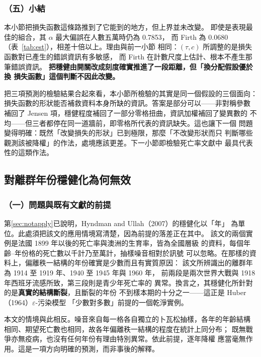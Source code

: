 \documentclass[UTF8, fontset=macnew, a4paper, 12pt]{ctexart}
\begin{document}
\subsubsection{（五）小結}

本小節把損失函數這條路推到了它能到的地方，但上界並未改變。
即使是表現最佳的組合，其 $\alpha$ 最大偏誤在人數五萬時仍為 0.7853，
而 Firth 為 0.0680（表~\ref{tab:est}），相差十倍以上。理由與前一小節
相同：$(\tau,c)$ 所調整的是損失函數對已產生的錯誤資訊有多敏感，
而 Firth 在計數尺度上估計、根本不產生那筆錯誤資訊。
\textbf{把穩健由開關改成刻度確實推進了一段距離，但「換分配假設優於換
損失函數」這個判斷不因此改變。}

把三項預測的檢驗結果合起來看，本小節所檢驗的其實是同一個假設的三個面向：
損失函數的形狀能否補救資料本身所缺的資訊。答案是部分可以——非對稱參數
補回了 Jensen 項，穩健程度補回了一部分零格扭曲，資訊加權補回了變異數的
不均——但三者都停在同一道牆前，即零格所代表的資訊缺失。這也讓下一個
問題變得明確：既然「改變損失的形狀」已到極限，那麼「不改變形狀而只
判斷哪些觀測該被降權」的作法，處境應該更差。下一小節即檢驗死亡率文獻中
最具代表性的這類作法。

\subsection{對離群年份穩健化為何無效}\label{sec:hu}

\subsubsection{（一）問題與既有文獻的前提}

第\ref{sec:notapply}已說明，Hyndman and Ullah（2007）的穩健化以「年」
為單位。此處須把該文的應用情境寫清楚，因為前提的落差正在其中。
該文的兩個實例是法國 1899 年以後的死亡率與澳洲的生育率，皆為全國層級
的資料，每個年齡--年份格的死亡數以千計乃至萬計，抽樣噪音相對於訊號
可以忽略。在那樣的資料上，偏離秩一結構的年份確實是少數而且有實質原因：
該文所辨識出的離群年為 1914 至 1919 年、1940 至 1945 年與 1960 年，
前兩段是兩次世界大戰與 1918 年西班牙流感所致，第三段則是青少年死亡率的
異常。換言之，其穩健化所針對的是\textbf{真實的結構斷裂}，且斷裂的年份
不到樣本期的十分之一——這正是 Huber（1964）$\varepsilon$-污染模型
「少數對多數」前提的一個乾淨實例。

本文的情境與此相反。噪音來自每一格各自獨立的卜瓦松抽樣，各年的年齡結構
相同、期望死亡數也相同，故各年偏離秩一結構的程度在統計上同分布；
既無戰爭亦無疫病，也沒有任何年份有理由特別異常。依此前提，逐年降權
應當毫無作用。這是一項方向明確的預測，而非事後的解釋。
\end{document}
